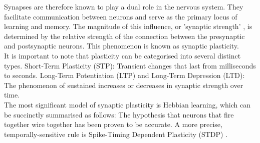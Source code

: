 


\noindent Synapses are therefore known to play a dual role in the nervous system. They facilitate communication between neurons and serve as the primary locus of learning and memory. The magnitude of this influence, or 'synaptic strength' \cite{bastos2022motor}, is determined by the relative strength of the connection between the presynaptic and postsynaptic neurons. This phenomenon is known as synaptic plasticity. \\

\noindent It is important to note that plasticity can be categorised into several distinct types. Short-Term Plasticity (STP): Transient changes that last from milliseconds to seconds. Long-Term Potentiation (LTP) and Long-Term Depression (LTD): The phenomenon of sustained increases or decreases in synaptic strength over time. \\

\noindent The most significant model of synaptic plasticity is Hebbian learning, which can be succinctly summarised as follows: The hypothesis that neurons that fire together wire together has been proven to be accurate. A more precise, temporally-sensitive rule is Spike-Timing Dependent Plasticity (STDP) \cite{zheng2018learning}. \\

